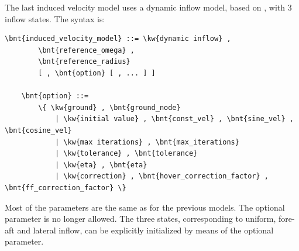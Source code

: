 The last induced velocity model uses a dynamic inflow model,
based on \cite{PITT}, with 3 inflow states.
The syntax is:
\begin{Verbatim}[commandchars=\\\{\}]
    \bnt{induced_velocity_model} ::= \kw{dynamic inflow} ,
        \bnt{reference_omega} ,
        \bnt{reference_radius}
        [ , \bnt{option} [ , ... ] ]

    \bnt{option} ::=
        \{ \kw{ground} , \bnt{ground_node}
            | \kw{initial value} , \bnt{const_vel} , \bnt{sine_vel} , \bnt{cosine_vel}
            | \kw{max iterations} , \bnt{max_iterations}
            | \kw{tolerance} , \bnt{tolerance}
            | \kw{eta} , \bnt{eta}
            | \kw{correction} , \bnt{hover_correction_factor} , \bnt{ff_correction_factor} \}
\end{Verbatim}
Most of the parameters are the same as for the previous models.
The optional  parameter is no longer allowed.
The three states, corresponding to uniform, fore-aft and lateral inflow,
can be explicitly initialized by means of the optional
 parameter.

